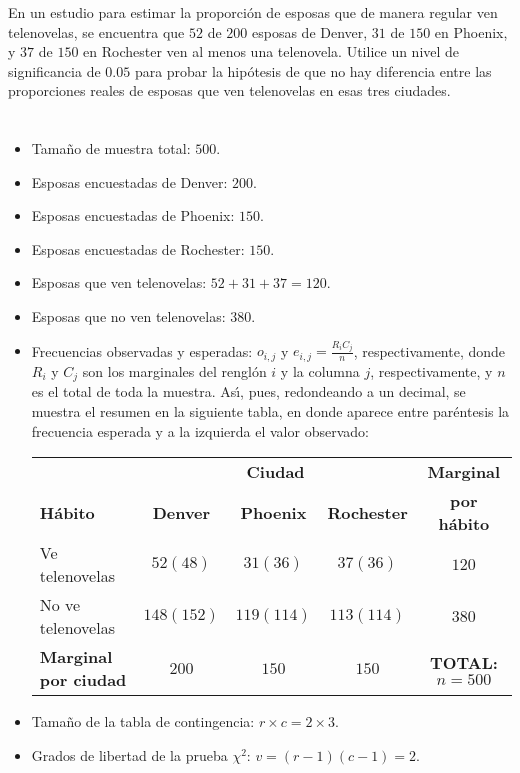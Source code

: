 \begin{enunciado}
 En un estudio para estimar la proporci\'on de esposas
 que de manera regular ven telenovelas,
 se encuentra que $52$ de $200$ esposas de Denver, $31$ de $150$ en Phoenix,
 y $37$ de $150$ en Rochester ven al menos una telenovela.
 Utilice un nivel de significancia de $0.05$ para probar la hip\'otesis
 de que no hay diferencia entre las proporciones reales de esposas
 que ven telenovelas en esas tres ciudades.
\end{enunciado}

\begin{solucion}
 \begin{datos}
  $\phantom{0}$
  \begin{itemize}
   \item Tamaño de muestra total: $500$.
   \item Esposas encuestadas de Denver: $200$.
   \item Esposas encuestadas de Phoenix: $150$.
   \item Esposas encuestadas de Rochester: $150$.
   \item Esposas que ven telenovelas: $52 + 31 + 37 = 120$.
   \item Esposas que no ven telenovelas: $380$.
   \item Frecuencias observadas y esperadas: $o_{i,j}$
   y $e_{i,j}=\frac{R_i C_j}{n}$, respectivamente,
   donde $R_i$ y $C_j$ son los marginales del rengl\'on $i$ y la columna $j$,
   respectivamente, y $n$ es el total de toda la muestra.
   As\'{\i}, pues, redondeando a un decimal, se muestra el resumen 
   en la siguiente tabla,
   en donde aparece entre par\'entesis la frecuencia esperada
   y a la izquierda el valor observado:
   \begin{center}
    \begin{tabular}{lccc|c}
     & \multicolumn{3}{c}{\textbf{Ciudad}} & \textbf{Marginal} \\
     \textbf{H\'abito} & \textbf{Denver} & \textbf{Phoenix} &
     \textbf{Rochester} & \textbf{por hábito} \\
     \hline
     Ve telenovelas & $52 (48)$ & $31 (36)$ & $37 (36)$ & $120$ \\
     No ve telenovelas & $148 (152)$ & $119 (114)$ & $113 (114)$ & $380$ \\
     \hline
     \textbf{Marginal por ciudad} & $200$ & $150$ & $150$ & 
     \textbf{TOTAL:} $n=500$
    \end{tabular}
   \end{center}
   \item Tama\~no de la tabla de contingencia: $r\times c = 2\times 3$.
   \item Grados de libertad de la prueba $\chi^2$: $v = (r-1)(c-1) = 2$.
  \end{itemize}
 \end{datos}
 

\end{solucion}
